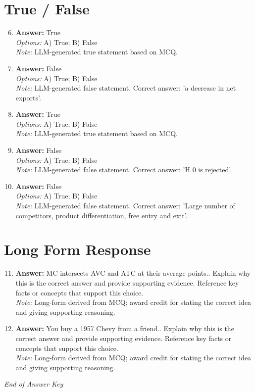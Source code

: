 \documentclass[12pt]{article}
\begin{document}
\section*{True / False}
\begin{enumerate}[label=\arabic*.]
\setcounter{enumi}{5}
\item \textbf{Answer:} True
\\ \textit{Options:} A) True; B) False
\\ \textit{Note:} LLM-generated true statement based on MCQ.
\item \textbf{Answer:} False
\\ \textit{Options:} A) True; B) False
\\ \textit{Note:} LLM-generated false statement. Correct answer: 'a decrease in net exports'.
\item \textbf{Answer:} True
\\ \textit{Options:} A) True; B) False
\\ \textit{Note:} LLM-generated true statement based on MCQ.
\item \textbf{Answer:} False
\\ \textit{Options:} A) True; B) False
\\ \textit{Note:} LLM-generated false statement. Correct answer: 'H 0 is rejected'.
\item \textbf{Answer:} False
\\ \textit{Options:} A) True; B) False
\\ \textit{Note:} LLM-generated false statement. Correct answer: 'Large number of competitors, product differentiation, free entry and exit'.
\end{enumerate}

\section*{Long Form Response}
\begin{enumerate}[label=\arabic*.]
\setcounter{enumi}{10}
\item \textbf{Answer:} MC intersects AVC and ATC at their average points.. Explain why this is the correct answer and provide supporting evidence. Reference key facts or concepts that support this choice.
\\ \textit{Note:} Long-form derived from MCQ; award credit for stating the correct idea and giving supporting reasoning.
\item \textbf{Answer:} You buy a 1957 Chevy from a friend.. Explain why this is the correct answer and provide supporting evidence. Reference key facts or concepts that support this choice.
\\ \textit{Note:} Long-form derived from MCQ; award credit for stating the correct idea and giving supporting reasoning.
\end{enumerate}

\vfill
\noindent\textit{End of Answer Key}
\end{document}
